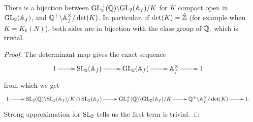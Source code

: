 \begin{prop}
    There is a bijection between $\mathrm{GL}_2^+(\mathbb{Q})\backslash\mathrm{GL}_2(\mathbb{A}_f)/K$ for $K$ compact open in $\mathrm{GL}_2(\mathbb{A}_f)$, and $\mathbb{Q}^+ \backslash \mathbb{A}_f^\times/\det(K)$. In particular, if $\det(K) = \hat{\mathbb{Z}}$ (for example when $K=K_0(N)$), both sides are in bijection with the class group of $\mathbb{Q}$, which is trivial.
\end{prop}
\begin{proof}
The determinant map gives the exact sequence
$$\xymatrix{1 \ar[r] & \SL_2(\adele_f) \ar[r] & \GL_2(\adele_f) \ar[r] & \adele_f^\times \ar[r] & 1}$$ from which we get
$$\xymatrix{1 \ar[r] & \SL_2(\QQ)\backslash\SL_2(\adele_f)/K \cap \SL_2(\adele_f) \ar[r] & \GL_2^+(\QQ)\backslash\GL_2(\adele_f)/K \ar[r] & \QQ^+ \backslash \adele_f^\times/\det(K) \ar[r] & 1.}$$
Strong approximation for $\mathrm{SL}_2$ tells us the first term is trivial.
\end{proof}

